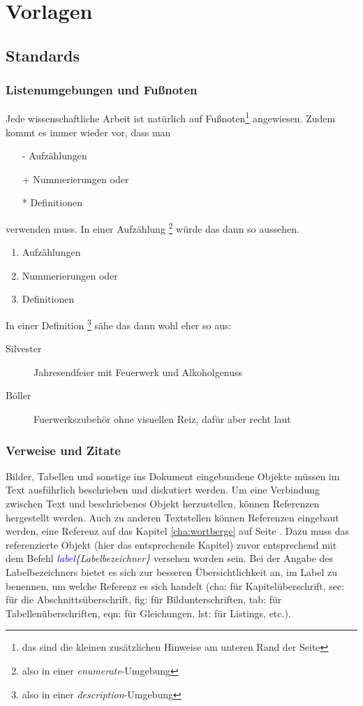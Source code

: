 \chapter{Vorlagen}
\label{cha:Vorlagen}

\section{Standards}
\subsection{Listenumgebungen und Fußnoten}
Jede wissenschaftliche Arbeit ist natürlich auf Fußnoten\footnote{das sind die kleinen zusätzlichen Hinweise am unteren Rand der Seite} angewiesen. Zudem kommt es immer wieder vor, dass man 
\begin{itemize}
\item[-] Aufzählungen
\item[+] Nummerierungen oder
\item[*] Definitionen 
\end{itemize}
verwenden muss. In einer Aufzählung \footnote{also in einer \textit{enumerate}-Umgebung} würde das dann so aussehen.
\begin{enumerate}
\item Aufzählungen
\item Nummerierungen oder
\item Definitionen 
\end{enumerate}

In einer Definition \footnote{also in einer \textit{description}-Umgebung} sähe das dann wohl eher so aus:

\begin{description}
\item[Silvester] Jahresendfeier mit Feuerwerk und Alkoholgenuss
\item[Böller] Fuerwerkszubehör ohne visuellen Reiz, dafür aber recht laut
\end{description}

\subsection{Verweise und Zitate}

Bilder, Tabellen und sonstige ins Dokument eingebundene Objekte müssen im Text ausführlich beschrieben und diskutiert werden. Um eine Verbindung zwischen Text und beschriebenes Objekt herzustellen, können Referenzen hergestellt werden. Auch zu anderen Textstellen können Referenzen eingebaut werden, \zB eine Referenz auf das Kapitel \ref{cha:wortberge} auf Seite \pageref{cha:wortberge}. Dazu muss das referenzierte Objekt (hier das entsprechende Kapitel) zuvor entsprechend mit dem Befehl \textit{\bs \textcolor{blue}{label}\{Labelbezeichner\}} versehen worden sein. Bei der Angabe des Labelbezeichners bietet es sich zur besseren Übersichtlichkeit an, im Label zu benennen, um welche Referenz es sich handelt (cha: für Kapitelüberschrift, sec: für die Abschnittsüberschrift, fig: für Bildunterschriften, tab: für Tabellenüberschriften, eqn: für Gleichungen, lst: für Listings, etc.).

